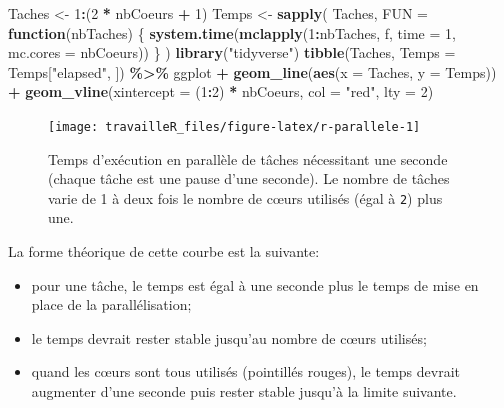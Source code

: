 \documentclass[
  12pt,
  french,
  a4paper,
  extrafontsizes,onecolumn,openright
  ]{memoir}
\newenvironment{Shaded}{\begin{snugshade}}{\end{snugshade}}
\newcommand{\AttributeTok}[1]{\textcolor[rgb]{0.13,0.29,0.53}{#1}}
\newcommand{\ControlFlowTok}[1]{\textcolor[rgb]{0.13,0.29,0.53}{\textbf{#1}}}
\newcommand{\DecValTok}[1]{\textcolor[rgb]{0.00,0.00,0.81}{#1}}
\newcommand{\FunctionTok}[1]{\textcolor[rgb]{0.13,0.29,0.53}{\textbf{#1}}}
\newcommand{\NormalTok}[1]{#1}
\newcommand{\OtherTok}[1]{\textcolor[rgb]{0.56,0.35,0.01}{#1}}
\newcommand{\SpecialCharTok}[1]{\textcolor[rgb]{0.81,0.36,0.00}{\textbf{#1}}}
\newcommand{\StringTok}[1]{\textcolor[rgb]{0.31,0.60,0.02}{#1}}
\providecommand{\tightlist}{%
  \setlength{\itemsep}{0pt}\setlength{\parskip}{0pt}}
\begin{document}
\begin{Shaded}
\begin{Highlighting}[]
\NormalTok{Taches }\OtherTok{\textless{}{-}} \DecValTok{1}\SpecialCharTok{:}\NormalTok{(}\DecValTok{2} \SpecialCharTok{*}\NormalTok{ nbCoeurs }\SpecialCharTok{+} \DecValTok{1}\NormalTok{)}
\NormalTok{Temps }\OtherTok{\textless{}{-}} \FunctionTok{sapply}\NormalTok{(}
\NormalTok{  Taches, }
  \AttributeTok{FUN =} \ControlFlowTok{function}\NormalTok{(nbTaches) \{}
    \FunctionTok{system.time}\NormalTok{(}\FunctionTok{mclapply}\NormalTok{(}\DecValTok{1}\SpecialCharTok{:}\NormalTok{nbTaches, f, }\AttributeTok{time =} \DecValTok{1}\NormalTok{, }\AttributeTok{mc.cores =}\NormalTok{ nbCoeurs))}
\NormalTok{  \}}
\NormalTok{)}
\FunctionTok{library}\NormalTok{(}\StringTok{"tidyverse"}\NormalTok{)}
\FunctionTok{tibble}\NormalTok{(Taches, }\AttributeTok{Temps =}\NormalTok{ Temps[}\StringTok{"elapsed"}\NormalTok{, ]) }\SpecialCharTok{\%\textgreater{}\%} 
\NormalTok{  ggplot }\SpecialCharTok{+}
  \FunctionTok{geom\_line}\NormalTok{(}\FunctionTok{aes}\NormalTok{(}\AttributeTok{x =}\NormalTok{ Taches, }\AttributeTok{y =}\NormalTok{ Temps)) }\SpecialCharTok{+}
  \FunctionTok{geom\_vline}\NormalTok{(}\AttributeTok{xintercept =}\NormalTok{ (}\DecValTok{1}\SpecialCharTok{:}\DecValTok{2}\NormalTok{) }\SpecialCharTok{*}\NormalTok{ nbCoeurs, }\AttributeTok{col =} \StringTok{"red"}\NormalTok{, }\AttributeTok{lty =} \DecValTok{2}\NormalTok{)}
\end{Highlighting}
\end{Shaded}

\begin{figure}

{\centering \texttt{[image: travailleR\_files/figure-latex/r-parallele-1]} 

}

\caption[Temps d'exécution en parallèle]{Temps d'exécution en parallèle de tâches nécessitant une seconde (chaque tâche est une pause d'une seconde). Le nombre de tâches varie de 1 à deux fois le nombre de cœurs utilisés (égal à \texttt{2}) plus une.}\label{fig:r-parallele}
\end{figure}

\normalsize

La forme théorique de cette courbe est la suivante:

\begin{itemize}
\tightlist
\item
  pour une tâche, le temps est égal à une seconde plus le temps de mise en place de la parallélisation;
\item
  le temps devrait rester stable jusqu'au nombre de cœurs utilisés;
\item
  quand les cœurs sont tous utilisés (pointillés rouges), le temps devrait augmenter d'une seconde puis rester stable jusqu'à la limite suivante.
\end{itemize}
\end{document}
